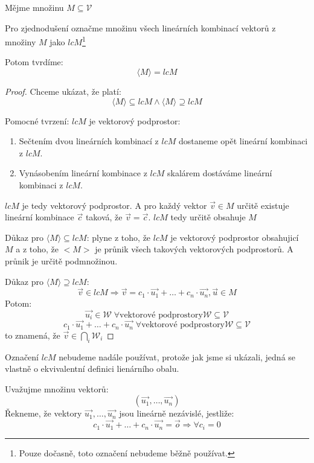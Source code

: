 \begin{theorem}
    Mějme množinu $M \subseteq \mathcal{V}$

    Pro zjednodušení označme množinu všech lineárních kombinací
    vektorů z množiny $M$ jako $lcM$\footnote{Pouze dočasně, toto
    označení nebudeme běžně používat.}

    Potom tvrdíme:
    $$\langle M \rangle = lcM$$
\end{theorem}
\begin{proof}
    Chceme ukázat, že platí:
    $$\langle M \rangle \subseteq lcM \wedge \langle M \rangle \supseteq lcM$$

    Pomocné tvrzení: $lcM$ je vektorový podprostor:
    \begin{enumerate}
        \item Sečtením dvou lineárních kombinací z $lcM$ dostaneme opět lineární kombinaci z $lcM$.
        \item Vynásobením lineární kombinace z $lcM$ skalárem dostáváme lineární kombinaci z $lcM$.
    \end{enumerate}
    $lcM$ je tedy vektorový podprostor. A pro každý vektor $\vec{v} \in M$ určitě existuje
    lineární kombinace $\vec{c}$ taková, že $\vec{v} = \vec{c}$. $lcM$ tedy určitě
    obsahuje $M$

    Důkaz pro $\langle M \rangle \subseteq lcM$: plyne z toho, že $lcM$ je vektorový
    podprostor obsahujicí $M$ a z toho, že $<M>$ je průnik všech takových vektorových
    podprostorů. A průnik je určitě podmnožinou.

    Důkaz pro $\langle M \rangle \supseteq lcM$:
    $$\vec{v} \in lcM \Rightarrow \vec{v} = c_1
        \cdot \vec{u_1} + \ldots + c_n \cdot \vec{u_n}, \vec{u} \in M$$
    Potom:
    $$\vec{u_i} \in \mathcal{W}\; \forall \text{vektorové podprostory}
        \mathcal{W} \subseteq \mathcal{V}$$
    $$c_1 \cdot \vec{u_1} + \ldots + c_n \cdot \vec{u_n} \; \forall
    \text{vektorové podprostory} \mathcal{W} \subseteq \mathcal{V}$$
    to znamená, že $\vec{v} \in \bigcap\limits_{i} \mathcal{W}_i$
\end{proof}

Označení $lcM$ nebudeme nadále používat, protože jak jsme si ukázali, jedná se vlastně
o ekvivalentní definici lienárního obalu.

\begin{definition}
    Uvažujme množinu vektorů:
    $$(\vec{u_1}, \ldots, \vec{u_n})$$
    Řekneme, že vektory $\vec{u_1}, \ldots, \vec{u_n}$ jsou lineárně nezávislé,
    jestliže:
    $$c_1\cdot\vec{u_1}+\ldots +c_n\cdot\vec{u_n} = \vec{o} \Rightarrow \forall c_i = 0$$
\end{definition}

